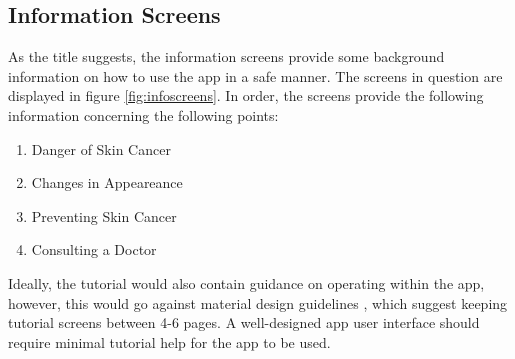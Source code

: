 \subsection{Information Screens} \label{sec:infoscreens}
As the title suggests, the information screens provide some background information on how to use the app in a safe manner. The screens in question are displayed in figure \ref{fig:infoscreens}. In order, the screens provide the following information concerning the following points:
\begin{enumerate}
    \item Danger of Skin Cancer
    \item Changes in Appeareance
    \item Preventing Skin Cancer
    \item Consulting a Doctor
\end{enumerate}

Ideally, the tutorial would also contain guidance on operating within the app, however, this would go against material design guidelines , which suggest keeping tutorial screens between 4-6 pages. A well-designed app user interface should require minimal tutorial help for the app to be used.

